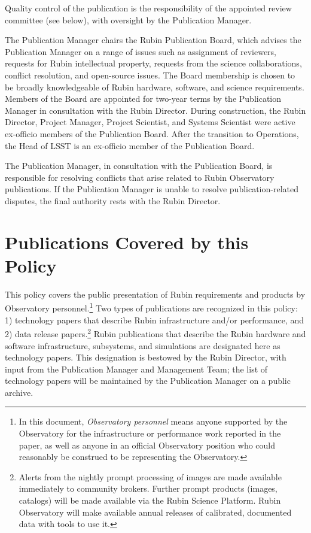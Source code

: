 Quality control of the publication is the responsibility of the appointed review committee (see below), with oversight by the Publication Manager.

The Publication Manager chairs the Rubin Publication Board, which advises the Publication Manager on a range of issues such as assignment of reviewers, requests for Rubin intellectual property, requests from the science collaborations, conflict resolution, and open-source issues.
The Board membership is chosen to be broadly knowledgeable of Rubin hardware, software, and science requirements.
Members of the Board are appointed for two-year terms by the Publication Manager in consultation with the Rubin Director.
During construction, the Rubin Director, Project Manager, Project Scientist, and Systems Scientist were active ex-officio members of the Publication Board.
After the transition to Operations, the Head of LSST is an ex-officio member of the Publication Board.

The Publication Manager, in consultation with the Publication Board, is responsible for resolving conflicts that arise related to Rubin Observatory publications.
If the Publication Manager is unable to resolve publication-related disputes, the final authority rests with the Rubin Director.

\section{Publications Covered by this Policy}\label{publications-covered-by-this-policy}

This policy covers the public presentation of Rubin requirements and products by Observatory personnel.\footnote{
  In this document, \emph{Observatory personnel} means anyone supported by the Observatory for the infrastructure or performance work reported in the paper, as well as anyone in an official Observatory position who could reasonably be construed to be representing the Observatory.
}
Two types of publications are recognized in this policy: 1) technology papers that describe Rubin infrastructure and/or performance, and 2) data release papers.\footnote{
Alerts from the nightly prompt processing of images are made available immediately to community brokers. Further prompt products (images, catalogs) will be made available via the Rubin Science Platform. 
  Rubin Observatory will make available annual releases of calibrated, documented data with tools to use it.
}
Rubin publications that describe the Rubin hardware and software infrastructure, subsystems, and simulations are designated here as technology papers.
This designation is bestowed by the Rubin Director, with input from the Publication Manager and Management Team; the list of technology papers will be maintained by the Publication Manager on a public archive.

